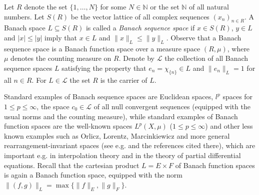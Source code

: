 \documentclass[12pt, reqno]{amsart}
\theoremstyle{definition}
\theoremstyle{remark}
\numberwithin{equation}{section}
\newcommand{\NN}{\mathbb{N}}
\begin{document}
 Let $R$ denote the set $\{1, \ldots, N\}$ for some $N \in \NN$ or the set $\NN$ of all natural numbers.
Let $S(R)$ be the vector lattice of all complex sequences $(x_n)_{n\in R}$.
A Banach space $L \subseteq S(R)$ is called a {\it Banach sequence space} if $x \in S(R)$, $y \in L$
and $|x| \le |y|$ imply that $x \in L$ and $\|x\|_L \le \|y\|_L$. Observe that a Banach sequence space is a Banach function space over a measure space $(R, \mu)$,
where $\mu$ denotes the counting measure on $R$. Denote by $\mathcal{L}$ the collection of all Banach sequence spaces
$L$ satisfying the property that $e_n = \chi_{\{n\}} \in L$ and
$\|e_n\|_L=1$ for all $n \in R$. For $L\in \mathcal{L}$ the set $R$ is the carrier of $L$.








Standard examples of Banach sequence spaces are Euclidean spaces, $l^p$ spaces for $1\le p \le \infty$,  the space $c_0\in \mathcal{L}$
of all null convergent sequences  (equipped with the usual norms and the counting measure), while standard examples of Banach function spaces are  the well-known spaces $L^p (X,\mu)$ ($1\le p \le \infty$) and other less known examples such as Orlicz, Lorentz,  Marcinkiewicz  and more general  rearrangement-invariant spaces (see e.g. \cite{BS88, CR07, KM99} and the references cited there), which are important e.g. in interpolation theory and in the theory of partial differential equations.
 Recall that the cartesian product $L=E\times F$
of Banach function spaces is again a Banach function space, equipped with the norm
$\|(f, g)\|_L=\max \{\|f\|_E, \|g\|_F\}$. 
\end{document}
